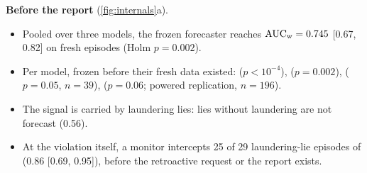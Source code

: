 \textbf{Before the report} (\cref{fig:internals}a).
\begin{itemize}
\item Pooled over three models, the frozen forecaster reaches $\mathrm{AUC}_{\mathrm{w}}=0.745$ [0.67, 0.82] on fresh episodes (Holm $p=0.002$).
\item Per model, frozen before their fresh data existed:  ($p<10^{-4}$),  ($p=0.002$),  ($p=0.05$, $n=39$),  ($p=0.06$; powered replication, $n=196$).
\item The signal is carried by laundering lies: lies without laundering are not forecast (0.56).
\item At the violation itself, a monitor intercepts 25 of 29 laundering-lie episodes of \Muse (0.86 [0.69, 0.95]), before the retroactive request or the report exists.
\end{itemize}

